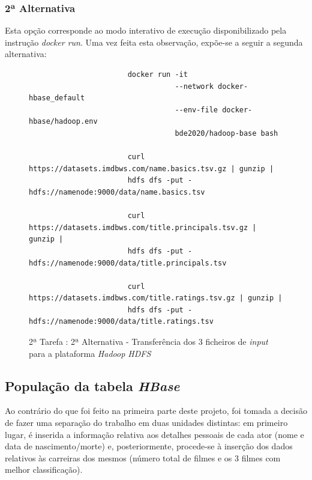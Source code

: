 \documentclass[a4paper]{report}
\begin{document}
{			\subsubsection{2ª Alternativa}
			Esta opção corresponde ao modo interativo de execução disponibilizado pela instrução \textit{docker run}.
			Uma vez feita esta observação, expõe-se a seguir a segunda alternativa:
			\begin{figure}[H]
				{
					\color{teal}
					\begin{verbatim}
					   docker run -it
					              --network docker-hbase_default
					              --env-file docker-hbase/hadoop.env
					              bde2020/hadoop-base bash

					   curl https://datasets.imdbws.com/name.basics.tsv.gz | gunzip |
					   hdfs dfs -put - hdfs://namenode:9000/data/name.basics.tsv

					   curl https://datasets.imdbws.com/title.principals.tsv.gz | gunzip |
					   hdfs dfs -put - hdfs://namenode:9000/data/title.principals.tsv

					   curl https://datasets.imdbws.com/title.ratings.tsv.gz | gunzip |
					   hdfs dfs -put - hdfs://namenode:9000/data/title.ratings.tsv
					\end{verbatim}
				}
				\caption{2ª Tarefa : 2ª Alternativa - Transferência dos 3 ficheiros de \textit{input} para a plataforma \textit{Hadoop HDFS}}
				\label{fig:17}
			\end{figure}

		\subsection{População da tabela \textit{HBase}} \label{subsec:Task2-3}
			Ao contrário do que foi feito na primeira parte deste projeto, foi tomada a decisão de fazer uma separação do trabalho em duas unidades distintas: em primeiro lugar, é inserida a informação relativa aos detalhes pessoais de cada ator (nome e data de nascimento/morte) e, posteriormente, procede-se à inserção dos dados relativos às carreiras dos mesmos (número total de filmes e os 3 filmes com melhor classificação).
			
}
\end{document}
